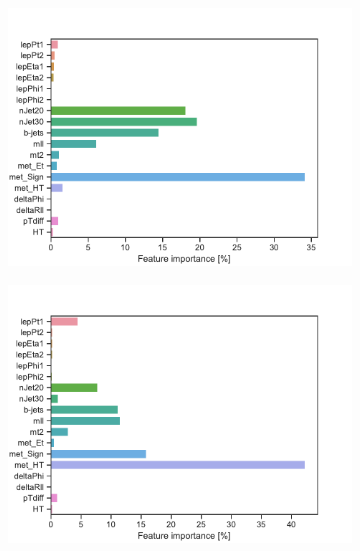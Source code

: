 \begin{figure}[H]
\begin{subfigure}[t!]{0.49\textwidth}
        \includegraphics[width = \textwidth]{Figures/WW/BDT/All_level/Inter/featureImportance.pdf}
        \caption{}
        \label{fig:featWWLow}
    \end{subfigure}
    \begin{subfigure}[t!]{0.49\textwidth}
        \includegraphics[width = \textwidth]{Figures/Mono_Z/ML/BDT/All_level/Inter/featureImportance.pdf}
        \caption{}
        \label{fig:featMonoZLow}
    \end{subfigure}
    \caption{}
    \label{fig:resExample}
\end{figure}


